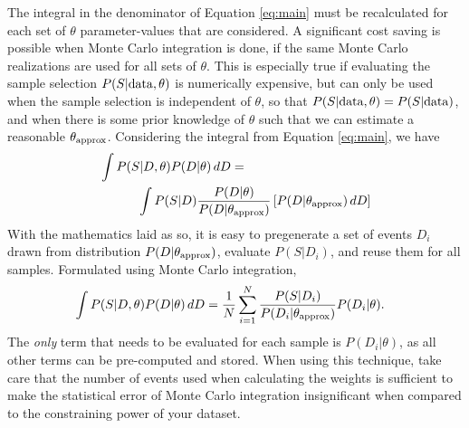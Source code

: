\documentclass[a4paper,fleqn,usenatbib]{mnras}
\begin{document}
The integral in the denominator of Equation \eqref{eq:main} must be recalculated for each set of $\theta$ parameter-values that are considered. A significant cost saving is possible when Monte Carlo integration is done, if the same Monte Carlo realizations are used for all sets of $\theta$. This is especially true if evaluating the sample selection $P(S|{\rm data}, \theta)$ is numerically expensive, but can only be used when the sample selection is independent of $\theta$, so that $P(S|{\rm data}, \theta) = P(S|{\rm data})$, and when there is some prior knowledge of $\theta$ such that we can estimate a reasonable $\theta_{\rm approx}$. Considering the integral from Equation \eqref{eq:main}, we have
\begin{align}
&\int P(S|D, \theta) P(D|\theta) \, dD = \notag \\
&\quad\quad\quad\int P(S|D) \frac{P(D|\theta)}{P(D|\theta_{\rm approx})} \left[ P(D|\theta_{\rm approx}) \,dD \right]
\end{align}
With the mathematics laid as so, it is easy to pregenerate a set of events $D_i$ drawn from distribution $ P(D|\theta_{\rm approx})$, evaluate $P(S|D_i)$, and reuse them for all samples. Formulated using Monte Carlo integration,
\begin{align}
&\int P(S|D, \theta) P(D|\theta) \, dD = \frac{1}{N} \sum_{i=1}^N \frac{P(S|D_i)}{P(D_i|\theta_{\rm approx})} P(D_i|\theta).
\end{align}
The \textit{only} term that needs to be evaluated for each sample is $P(D_i|\theta)$, as all other terms can be pre-computed and stored. When using this technique, take care that the number of events used when calculating the weights is sufficient to make the statistical error of Monte Carlo integration insignificant when compared to the constraining power of your dataset.
\end{document}
